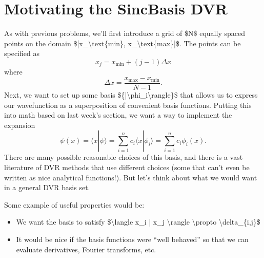 \documentclass[letterpaper,10pt,english]{jupyterBook}
\begin{document}
\section{Motivating the Sinc\sphinxhyphen{}Basis DVR}
\label{\detokenize{Section4_v2:motivating-the-sinc-basis-dvr}}
\sphinxAtStartPar
As with previous problems, we’ll first introduce a grid of \$N\$ equally spaced points on the domain \${[}x\_\textbackslash{}text\{min\}, x\_\textbackslash{}text\{max\}{]}\$. The points can be specified as
\label{equation:Section4_v2:616d9bf9-aae3-43d1-8b40-938f6620901f}\begin{equation}
x_j = x_\text{min} + (j-1) \Delta x
\end{equation}
\sphinxAtStartPar
where
\label{equation:Section4_v2:57a6a3a4-9bae-4237-bedf-7fdc1da1b650}\begin{equation}
\Delta x = \frac{x_\text{max} - x_\text{min}}{N-1}.
\end{equation}
\sphinxAtStartPar
Next, we want to set up some basis \$\{|\textbackslash{}phi\_i\textbackslash{}rangle\}\$ that allows us to express our wavefunction as a superposition of convenient basis functions. Putting this into math based on last week’s section, we want a way to implement the expansion
\label{equation:Section4_v2:30ad070c-8150-4527-a63c-24fdb9c310b5}\begin{equation}
\psi(x) = \langle x | \psi \rangle = \sum_{i=1}^{n} c_i \langle x | \phi_i \rangle = \sum_{i=1}^{n} c_i \phi_i(x).
\end{equation}
\sphinxAtStartPar
There are many possible reasonable choices of this basis, and there is a vast literature of DVR methods that use different choices (some that can’t even be written as nice analytical functions!). But let’s think about what we would want in a general DVR basis set.

\sphinxAtStartPar
{}

\sphinxAtStartPar
{} Some example of useful properties would be:
\begin{itemize}
\item {} 
\sphinxAtStartPar
We want the basis to satisfy \$\textbackslash{}langle x\_i | x\_j \textbackslash{}rangle \textbackslash{}propto \textbackslash{}delta\_\{i,j\}\$

\item {} 
\sphinxAtStartPar
It would be nice if the basis functions were “well behaved” so that we can evaluate derivatives, Fourier transforms, etc.

\end{itemize}
\end{document}
